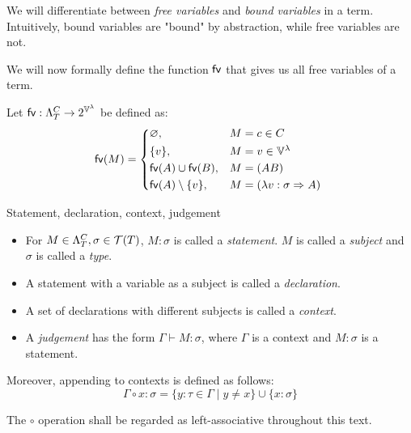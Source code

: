 \documentclass[main.tex]{subfiles}
\begin{document}
We will differentiate between \emph{free variables} and \emph{bound variables}
in a term. Intuitively, bound variables are "bound" by abstraction, while
free variables are not.

We will now formally define the function $\mathsf{fv}$ that gives us all free variables of a
term.
\begin{defn}
    Let $\mathsf{fv} : \Lambda_T^C \rightarrow 2^{\mathbb{V}^{\lambda}}$ be defined as:
    \[
        \fv{M} =
        \begin{cases*}
            \varnothing, & $M = c \in C$ \\
            \{ v \}, & $M = v \in \lvars$ \\
            \fv{A} \cup \fv{B}, & $M = (AB)$ \\
            \fv{A} \setminus \{ v \}, & $M = (\lambda v : \sigma \abstr A)$ \\
        \end{cases*}
    \]
\end{defn}

\begin{defn}
    Statement, declaration, context, judgement \cite[chap.~2.4]{ttfp}
    \begin{itemize}
        \item For $M \in \Lambda_T^C, \sigma \in \mathcal{T}( T )$, $M : \sigma$ is called
            a \emph{statement}. $M$ is called a \emph{subject} and $\sigma$
            is called a \emph{type}.
        \item A statement with a variable as a subject is called a \emph{declaration}.
        \item A set of declarations with different subjects is called a \emph{context}.
        \item A \emph{judgement} has the form $\Gamma \vdash M: \sigma$, where
            $\Gamma$ is a context and $M: \sigma$ is a statement.
    \end{itemize}

    Moreover, appending to contexts is defined as follows:
    \[ \Gamma \circ x : \sigma = \{ y : \tau \in \Gamma \mid y \neq x \}
       \cup \{ x : \sigma \} \]
\end{defn}

The $\circ$ operation shall be regarded as left-associative throughout this
text.
\end{document}
